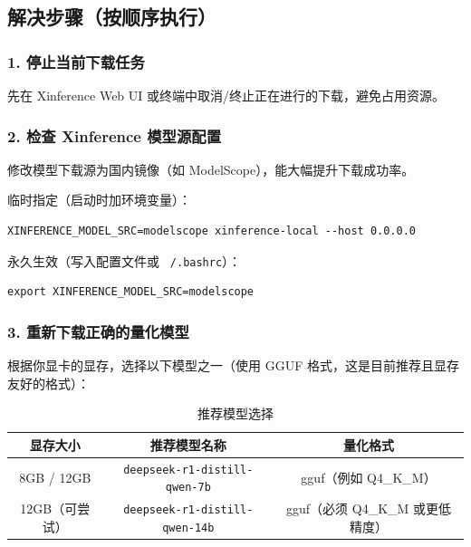 \documentclass[12pt,UTF8]{ctexbook}
\begin{document}
\subsection{解决步骤（按顺序执行）}

\subsubsection{1. 停止当前下载任务}

先在 Xinference Web UI 或终端中取消/终止正在进行的下载，避免占用资源。

\subsubsection{2. 检查 Xinference 模型源配置}

修改模型下载源为国内镜像（如 ModelScope），能大幅提升下载成功率。

临时指定（启动时加环境变量）：

\begin{lstlisting}
XINFERENCE_MODEL_SRC=modelscope xinference-local --host 0.0.0.0
\end{lstlisting}

永久生效（写入配置文件或 \texttt{~/.bashrc}）：

\begin{lstlisting}
export XINFERENCE_MODEL_SRC=modelscope
\end{lstlisting}

\subsubsection{3. 重新下载正确的量化模型}

根据你显卡的显存，选择以下模型之一（使用 GGUF 格式，这是目前推荐且显存友好的格式）：

\begin{table}[htbp]
    \centering
    \caption{推荐模型选择}
    \begin{tabular}{|c|c|c|}
        \hline
        \textbf{显存大小} & \textbf{推荐模型名称} & \textbf{量化格式} \\
        \hline
        8GB / 12GB & \texttt{deepseek-r1-distill-qwen-7b} & gguf（例如 Q4\_K\_M） \\
        \hline
        12GB（可尝试） & \texttt{deepseek-r1-distill-qwen-14b} & gguf（必须 Q4\_K\_M 或更低精度） \\
        \hline
    \end{tabular}
\end{table}
\end{document}

